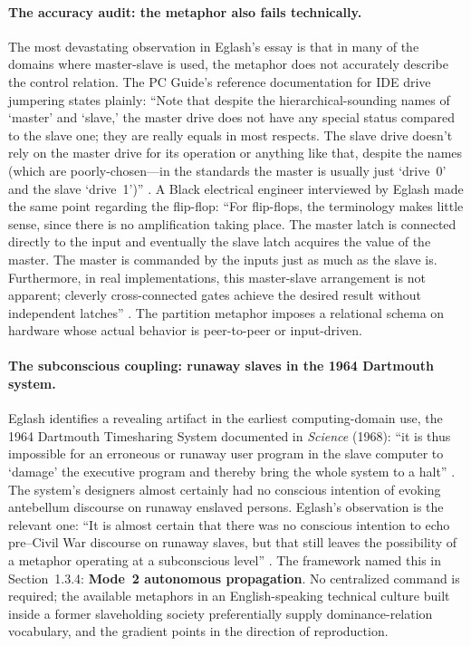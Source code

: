 \paragraph{The accuracy audit: the metaphor also fails technically.}
The most devastating observation in Eglash's essay is that in many of the domains where master-slave is used, the metaphor does not accurately describe the control relation. The PC Guide's reference documentation for IDE drive jumpering states plainly: ``Note that despite the hierarchical-sounding names of `master' and `slave,' the master drive does not have any special status compared to the slave one; they are really equals in most respects. The slave drive doesn't rely on the master drive for its operation or anything like that, despite the names (which are poorly-chosen---in the standards the master is usually just `drive~0' and the slave `drive~1')'' \cite{eglash_broken}. A Black electrical engineer interviewed by Eglash made the same point regarding the flip-flop: ``For flip-flops, the terminology makes little sense, since there is no amplification taking place. The master latch is connected directly to the input and eventually the slave latch acquires the value of the master. The master is commanded by the inputs just as much as the slave is. Furthermore, in real implementations, this master-slave arrangement is not apparent; cleverly cross-connected gates achieve the desired result without independent latches'' \cite{eglash_broken}. The partition metaphor imposes a relational schema on hardware whose actual behavior is peer-to-peer or input-driven.

\paragraph{The subconscious coupling: runaway slaves in the 1964 Dartmouth system.}
Eglash identifies a revealing artifact in the earliest computing-domain use, the 1964 Dartmouth Timesharing System documented in \textit{Science} (1968): ``it is thus impossible for an erroneous or runaway user program in the slave computer to `damage' the executive program and thereby bring the whole system to a halt'' \cite{kemeny_kurtz}. The system's designers almost certainly had no conscious intention of evoking antebellum discourse on runaway enslaved persons. Eglash's observation is the relevant one: ``It is almost certain that there was no conscious intention to echo pre--Civil War discourse on runaway slaves, but that still leaves the possibility of a metaphor operating at a subconscious level'' \cite{eglash_broken}. The framework named this in Section~1.3.4: \textbf{Mode~2 autonomous propagation}. No centralized command is required; the available metaphors in an English-speaking technical culture built inside a former slaveholding society preferentially supply dominance-relation vocabulary, and the gradient points in the direction of reproduction.

